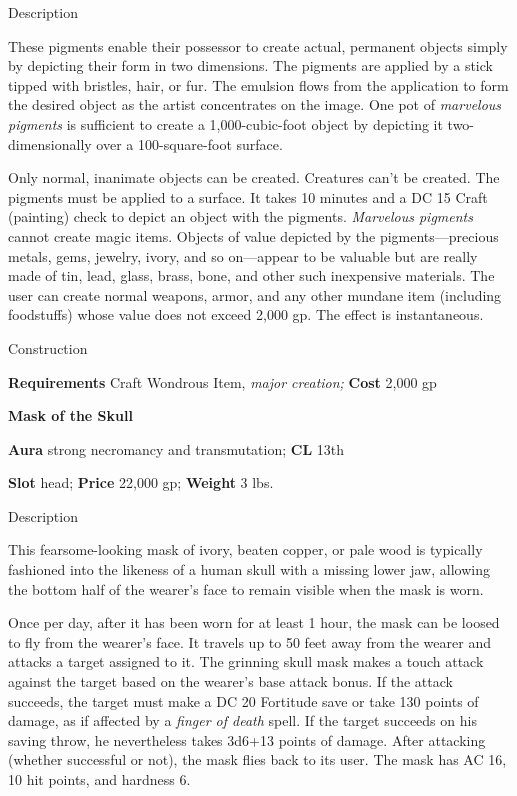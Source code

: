 Description
				
These pigments enable their possessor to create actual, permanent objects simply by depicting their form in two dimensions. The pigments are applied by a stick tipped with bristles, hair, or fur. The emulsion flows from the application to form the desired object as the artist concentrates on the image. One pot of \textit{marvelous pigments} is sufficient to create a 1,000-cubic-foot object by depicting it two-dimensionally over a 100-square-foot surface. 
				
Only normal, inanimate objects can be created. Creatures can't be created. The pigments must be applied to a surface. It takes 10 minutes and a DC 15 Craft (painting) check to depict an object with the pigments. \textit{Marvelous pigments} cannot create magic items. Objects of value depicted by the pigments---precious metals, gems, jewelry, ivory, and so on---appear to be valuable but are really made of tin, lead, glass, brass, bone, and other such inexpensive materials. The user can create normal weapons, armor, and any other mundane item (including foodstuffs) whose value does not exceed 2,000 gp. The effect is instantaneous. 
				
Construction
				
\textbf{Requirements} Craft Wondrous Item,\textit{ major creation;}\textbf{ Cost }2,000 gp
				
\textbf{Mask of the Skull}
				
\textbf{Aura} strong necromancy and transmutation;\textbf{ CL }13th
				
\textbf{Slot} head; \textbf{Price} 22,000 gp; \textbf{Weight} 3 lbs.
				
Description
				
This fearsome-looking mask of ivory, beaten copper, or pale wood is typically fashioned into the likeness of a human skull with a missing lower jaw, allowing the bottom half of the wearer's face to remain visible when the mask is worn.
				
Once per day, after it has been worn for at least 1 hour, the mask can be loosed to fly from the wearer's face. It travels up to 50 feet away from the wearer and attacks a target assigned to it. The grinning skull mask makes a touch attack against the target based on the wearer's base attack bonus. If the attack succeeds, the target must make a DC 20 Fortitude save or take 130 points of damage, as if affected by a \textit{finger of death} spell. If the target succeeds on his saving throw, he nevertheless takes 3d6+13 points of damage. After attacking (whether successful or not), the mask flies back to its user. The mask has AC 16, 10 hit points, and hardness 6. 
				
